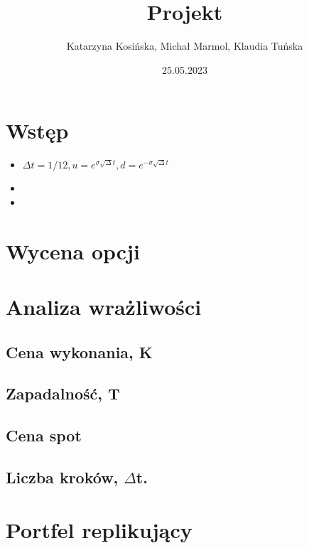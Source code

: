 \documentclass[12pt]{mwrep}
\title{Projekt}
\author{Katarzyna Kosińska, Michał Marmol, Klaudia Tuńska}
\date{25.05.2023}
\begin{document}
\maketitle

\tableofcontents

\chapter{Wstęp}

\begin{itemize}
\item $\Delta t=1/12, u=e^{\sigma\sqrt{\Delta}t}, d=e^{-\sigma\sqrt{\Delta}t}$
\item 
\item 
\end{itemize}

\chapter{Wycena opcji}

\chapter{Analiza wrażliwości}

\section{Cena wykonania, K}


\section{Zapadalność, T}

\section{Cena spot}
\section{Liczba kroków, $\Delta$t.}

\chapter{Portfel replikujący}
\end{document}
